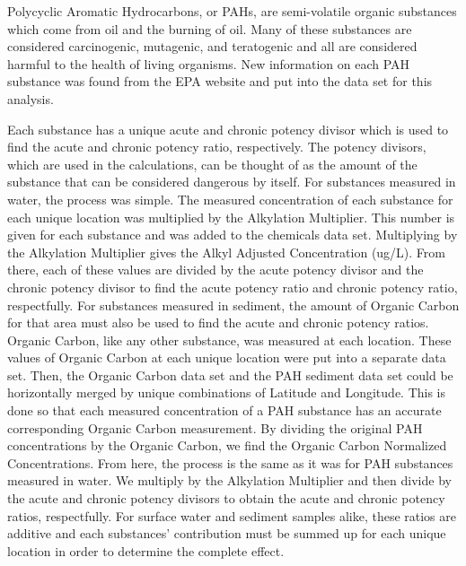 \documentclass[11pt]{article}
\begin{document}
Polycyclic Aromatic Hydrocarbons, or PAHs, are semi-volatile organic substances which come from oil and the burning of oil.  Many of these substances are considered carcinogenic, mutagenic, and teratogenic and all are considered harmful to the health of living organisms.  New information on each PAH substance was found from the EPA website and put into the data set for this analysis.  

Each substance has a unique acute and chronic potency divisor which is used to find the acute and chronic potency ratio, respectively.  The potency divisors, which are used in the calculations, can be thought of as the amount of the substance that can be considered dangerous by itself. For substances measured in water, the process was simple.  The measured concentration of each substance for each unique location was multiplied by the Alkylation Multiplier.  This number is given for each substance and was added to the chemicals data set.  Multiplying by the Alkylation Multiplier gives the Alkyl Adjusted Concentration (ug/L).  From there, each of these values are divided by the acute potency divisor and the chronic potency divisor to find the acute potency ratio and chronic potency ratio, respectfully.  For substances measured in sediment, the amount of Organic Carbon for that area must also be used to find the acute and chronic potency ratios. Organic Carbon, like any other substance, was measured at each location.  These values of Organic Carbon at each unique location were put into a separate data set.  Then, the Organic Carbon data set and the PAH sediment data set could be horizontally merged by unique combinations of Latitude and Longitude.  This is done so that each measured concentration of a PAH substance has an accurate corresponding Organic Carbon measurement.  By dividing the original PAH concentrations by the Organic Carbon, we find the Organic Carbon Normalized Concentrations.  From here, the process is the same as it was for PAH substances measured in water.  We multiply by the Alkylation Multiplier and then divide by the acute and chronic potency divisors to obtain the acute and chronic potency ratios, respectfully.   For surface water and sediment samples alike, these ratios are additive and each substances' contribution must be summed up for each unique location in order to determine the complete effect. 
\end{document}
